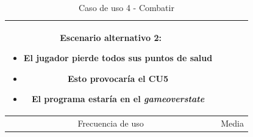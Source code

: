 \documentclass[a4paper]{article}
\begin{document}
\begin{table}[!ht]
\begin{tabular}{|c|p{12cm}|}
\begin{itemize}
        \end{itemize}
        \textbf{Escenario alternativo 2:}
        \begin{itemize}
            \item El jugador pierde todos sus puntos de salud
            \item Esto provocaría el \textbf{CU5}
            \item El programa estaría en el \textit{gameoverstate}
        \end{itemize}                                                                         \\
        \hline
        Frecuencia de uso      & Media                                                                                                \\
        \hline
    \end{tabular}
    \caption{Caso de uso 4 - Combatir}
    \label{tab:casosdeuso4-table}
\end{table}
\end{document}
